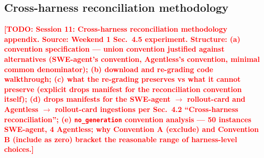 \documentclass{article}
\newcommand{\todo}[1]{\textcolor{red}{\textbf{[TODO: #1]}}}
\begin{document}


\subsection{Cross-harness reconciliation methodology}
\label{app:reconciliation}

\todo{Session 11: Cross-harness reconciliation methodology appendix. Source: Weekend 1 Sec.~4.5 experiment.
Structure: (a) convention specification --- union convention justified against alternatives (SWE-agent's convention, Agentless's convention, minimal common denominator); (b) download and re-grading code walkthrough; (c) what the re-grading preserves vs what it cannot preserve (explicit drops manifest for the reconciliation convention itself); (d) drops manifests for the SWE-agent $\to$ rollout-card and Agentless $\to$ rollout-card ingestions per Sec.~4.2 ``Cross-harness reconciliation''; (e) \texttt{no\_generation} convention analysis --- 50 instances SWE-agent, 4 Agentless; why Convention A (exclude) and Convention B (include as zero) bracket the reasonable range of harness-level choices.}

\end{document}
